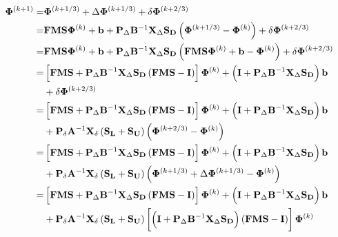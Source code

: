 \begin{equation}
\label{eq::DSA_MJIA_update_FULL}
\begin{aligned}
{\bf \Phi}^{(k+1)} = &{\bf \Phi}^{(k+1/3)} + \Delta {\bf \Phi}^{(k+1/3)} + \delta {\bf \Phi}^{(k+2/3)} \\
= &{\bf F}  {\bf M} {\bf S} {\bf \Phi}^{(k)}+{\bf b} + {\bf P}_{\Delta} {\bf B}^{-1} {\bf X}_{\Delta} {\bf S_D} \left(  {\bf \Phi}^{(k+1/3)} - {\bf \Phi}^{(k)} \right) + \delta {\bf \Phi}^{(k+2/3)} \\
= &{\bf F}  {\bf M} {\bf S} {\bf \Phi}^{(k)}+{\bf b} + {\bf P}_{\Delta} {\bf B}^{-1} {\bf X}_{\Delta} {\bf S_D} \left(   {\bf F}  {\bf M} {\bf S} {\bf \Phi}^{(k)}+{\bf b} - {\bf \Phi}^{(k)} \right) + \delta {\bf \Phi}^{(k+2/3)} \\ 
= &\left[{\bf F}  {\bf M} {\bf S}  + {\bf P}_{\Delta} {\bf B}^{-1} {\bf X}_{\Delta} {\bf S_D} \left(   {\bf F}  {\bf M} {\bf S}  - {\bf I} \right) \right] {\bf \Phi}^{(k)} +\left( {\bf I} + {\bf P}_{\Delta} {\bf B}^{-1} {\bf X}_{\Delta} {\bf S_D}  \right) {\bf b} \\
&+ \delta {\bf \Phi}^{(k+2/3)} \\
=&\left[{\bf F}  {\bf M} {\bf S}  + {\bf P}_{\Delta} {\bf B}^{-1} {\bf X}_{\Delta} {\bf S_D} \left(   {\bf F}  {\bf M} {\bf S}  - {\bf I} \right) \right] {\bf \Phi}^{(k)} +\left( {\bf I} + {\bf P}_{\Delta} {\bf B}^{-1} {\bf X}_{\Delta} {\bf S_D}  \right) {\bf b}  \\
&+{\bf P}_{\delta}{\bf A}^{-1}  {\bf X}_{\delta}\left(   {\bf S_L} +  {\bf S_U} \right) \left(  {\bf \Phi}^{(k+2/3)} - {\bf \Phi}^{(k)}  \right)  \\
=&\left[{\bf F}  {\bf M} {\bf S}  + {\bf P}_{\Delta} {\bf B}^{-1} {\bf X}_{\Delta} {\bf S_D} \left(   {\bf F}  {\bf M} {\bf S}  - {\bf I} \right) \right] {\bf \Phi}^{(k)} +\left( {\bf I} + {\bf P}_{\Delta} {\bf B}^{-1} {\bf X}_{\Delta} {\bf S_D}  \right) {\bf b}  \\
&+{\bf P}_{\delta}{\bf A}^{-1}  {\bf X}_{\delta}\left(   {\bf S_L} +  {\bf S_U} \right) \left(  {\bf \Phi}^{(k+1/3)} + \Delta {\bf \Phi}^{(k+1/3)} - {\bf \Phi}^{(k)}  \right)  \\
=&\left[{\bf F}  {\bf M} {\bf S}  + {\bf P}_{\Delta} {\bf B}^{-1} {\bf X}_{\Delta} {\bf S_D} \left(   {\bf F}  {\bf M} {\bf S}  - {\bf I} \right) \right] {\bf \Phi}^{(k)} +\left( {\bf I} + {\bf P}_{\Delta} {\bf B}^{-1} {\bf X}_{\Delta} {\bf S_D}  \right) {\bf b}  \\
&+{\bf P}_{\delta}{\bf A}^{-1}  {\bf X}_{\delta}\left(   {\bf S_L} +  {\bf S_U} \right) \left[  \left(  {\bf I} + {\bf P}_{\Delta} {\bf B}^{-1} {\bf X}_{\Delta} {\bf S_D} \right) \left(   {\bf F}  {\bf M} {\bf S}  - {\bf I} \right)  \right]   {\bf \Phi}^{(k)} \\

\end{aligned}
\end{equation}
